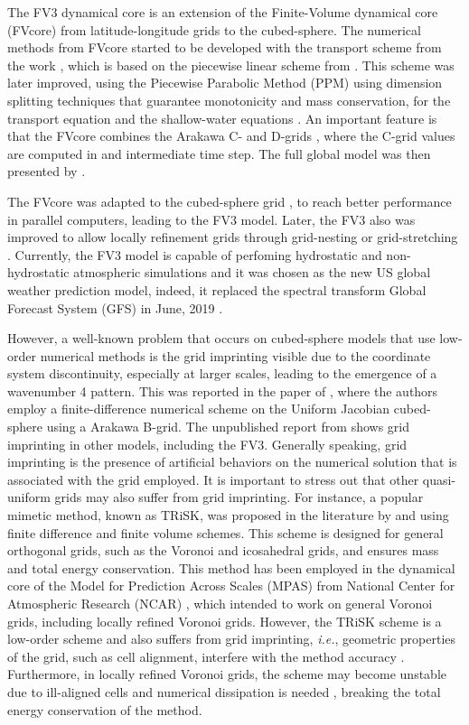 The FV3 dynamical core is an extension of the Finite-Volume dynamical core (FVcore)
from latitude-longitude grids to the cubed-sphere.
The numerical methods from FVcore started to be developed with the transport scheme from the work \citet{lin:1994},
which is based on the piecewise linear scheme from \citet{vanleer:1977}. 
This scheme was later improved, using the Piecewise Parabolic Method (PPM) \citep{colella:1984, carpenter:1990}
using dimension splitting techniques that guarantee monotonicity and mass conservation,
for the transport equation \citep{lin:1996} and the shallow-water equations \citep{lin:1997}. 
An important feature is that the FVcore combines the  Arakawa C- and D-grids \citep{arakawa:1977},
where the C-grid values are computed in and intermediate time step. 
The full global model was then presented by \citet{lin:2004}.

The FVcore was adapted to the cubed-sphere grid \citep{putmanthesis:2007, putman:2007}, 
to reach better performance in parallel computers, leading to the FV3 model.
Later, the FV3 also was improved to allow locally refinement grids 
through grid-nesting or grid-stretching \citep{harris:2013}.
Currently, the FV3 model is capable of perfoming hydrostatic and non-hydrostatic atmospheric simulations 
and it was chosen as the new US global weather prediction model, indeed, it replaced the spectral transform
Global Forecast System (GFS) in June, 2019 \citep{samenow:2019}.

However, a well-known problem that occurs on cubed-sphere models that use low-order numerical methods
is the grid imprinting visible due to the coordinate system discontinuity, 
especially at larger scales, leading to the emergence of a wavenumber 4 pattern.
This was reported in the paper of \citet{rancic:2017}, where the authors employ a 
finite-difference numerical scheme on the Uniform Jacobian cubed-sphere using a Arakawa B-grid.
The unpublished report from \citet{whitaker:2015} shows grid imprinting in other models, including 
the FV3.
Generally speaking, grid imprinting is the presence of artificial behaviors on 
the numerical solution that is associated with the grid employed.
It is important to stress out that other quasi-uniform grids may also suffer from grid imprinting.
For instance, a popular mimetic method, known as TRiSK, was proposed in the literature by
\citet{thuburn:2009} and \citet{ringler:2010} using finite difference and finite volume schemes.
This scheme is designed for general orthogonal grids, such as the Voronoi and icosahedral grids,
and ensures mass and total energy conservation.
This method has been employed in the dynamical core of the Model for Prediction Across Scales (MPAS)
from National Center for Atmospheric Research (NCAR) \citep{skamarock:12}, 
which intended to work on general Voronoi grids, including locally refined Voronoi grids.
However, the TRiSK scheme is a low-order scheme and also suffers from grid imprinting, \textit{i.e.},
geometric properties of the grid, such as cell alignment, interfere with the method accuracy
\citep{weller:12, peixoto:13, peixoto:16}. Furthermore, in locally refined Voronoi grids,
the scheme may become unstable due to ill-aligned cells and numerical dissipation is needed \citep{santos:2021},
breaking the total energy conservation of the method.

